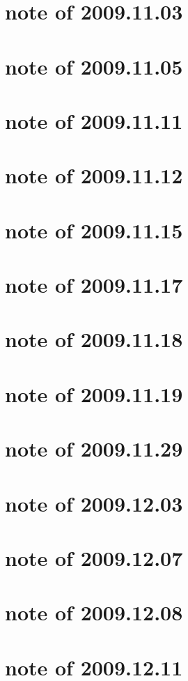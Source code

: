 \documentclass{article}
\begin{document}
\section{note of 2009.11.03}

\section{note of 2009.11.05}

\section{note of 2009.11.11}

\section{note of 2009.11.12}

\section{note of 2009.11.15}

\section{note of 2009.11.17}

 \section{note of 2009.11.18}

\section{note of 2009.11.19}

\section{note of 2009.11.29}



\section{note of 2009.12.03}

\section{note of 2009.12.07}

\section{note of 2009.12.08}

\section{note of 2009.12.11}

\end{document}
